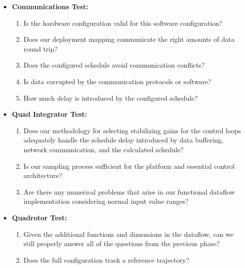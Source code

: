 \begin{itemize}
\item {\bf Communications Test:}
\begin{enumerate}
\item Is the hardware configuration valid for this software configuration?
\item Does our deployment mapping communicate the right amounts of data round trip?
\item Does the configured schedule avoid communication conflicts?
\item Is data corrupted by the communication protocols or software?
\item How much delay is introduced by the configured schedule?
\end{enumerate}
\item {\bf Quad Integrator Test:}
\begin{enumerate}
\item Does our methodology for selecting stabilizing gains for the control
loops adequately handle the schedule delay introduced by data buffering,
network communication, and the calculated schedule?
\item Is our sampling process sufficient for the platform and essential 
control architecture?
\item Are there any numerical problems that arise in our functional dataflow implementation considering normal input value ranges?
\end{enumerate}
\item {\bf Quadrotor Test:}
\begin{enumerate}
\item Given the additional functions and dimensions in the dataflow, can we still properly answer all of the questions from the previous phase?
\item Does the full configuration track a reference trajectory?
\end{enumerate}
\end{itemize}

